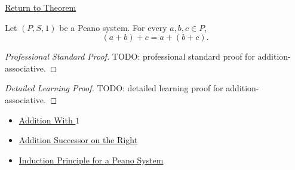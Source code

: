 \newpage
{}
\label{prf:addition-associative}

\begin{remark*}[Return]
\hyperref[thm:addition-associative]{Return to Theorem}
\end{remark*}

\begin{theorem*}
Let $(P,S,1)$ be a Peano system. For every $a,b,c \in P$,
\[
(a+b)+c=a+(b+c).
\]
\end{theorem*}

\begin{proof}[Professional Standard Proof]
\LRAProofBodyStart
TODO: professional standard proof for addition-associative.
\end{proof}

\begin{proof}[Detailed Learning Proof]
\LRAProofBodyStart
TODO: detailed learning proof for addition-associative.
\end{proof}

\begin{remark*}
\end{remark*}

\begin{dependencies}
\begin{itemize}
  \item \hyperref[thm:addition-with-one]{Addition With $1$}
  \item \hyperref[thm:addition-successor-on-right]{Addition Successor on the Right}
  \item \hyperref[thm:induction-principle-for-peano-system]{Induction Principle for a Peano System}
\end{itemize}
\end{dependencies}

\clearpage
